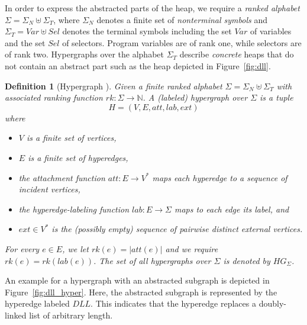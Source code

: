 \documentclass[a4paper, 12pt, twoside]{report}
\theoremstyle{plain}
\newtheorem{definition}[theorem]{Definition}
\begin{document}
	In order to express the abstracted parts of the heap, we require a \textit{ranked alphabet} $\Sigma = \Sigma_N \uplus \Sigma_T$, where $\Sigma_N$ denotes a finite set of \textit{nonterminal symbols} and $\Sigma_T=Var \uplus Sel$ denotes the terminal symbols including the set $Var$ of variables and the set $Sel$ of selectors. Program variables are of rank one, while selectors are of rank two. Hypergraphs over the alphabet $\Sigma_T$ describe \textit{concrete} heaps that do not contain an abstract part such as the heap depicted in Figure~\ref{fig:dll}.

	
	\begin{definition}[Hypergraph \cite{heinen2015verifyingPhd}]\label{def:hypergraph}
		Given a finite ranked alphabet $\Sigma = \Sigma_N \uplus \Sigma_T$ with associated ranking function $rk : \Sigma \rightarrow \mathds{N}$. A (labeled) hypergraph over $\Sigma$ is a tuple \[H = (V ,E, att, lab, ext)\]
		where 
		\begin{itemize}
			\item $V$ is a finite set of vertices,
			\item $E$ is a finite set of hyperedges,
			\item the attachment function $att : E \rightarrow V^*$ maps each hyperedge to a sequence of incident vertices, 
			\item the hyperedge-labeling function $lab : E \rightarrow \Sigma$ maps to each edge its label, and 
			\item $ext \in V^*$ is the (possibly empty) sequence of pairwise distinct external vertices. 
		\end{itemize}
		For every $e \in E$, we let $rk(e) = |att(e)|$ and we require $rk(e) = rk(lab(e))$. The set of all hypergraphs over $\Sigma$ is denoted by $HG_{\Sigma}$.
	\end{definition}
	
	An example for a hypergraph with an abstracted subgraph is depicted in Figure~\ref{fig:dll_hyper}. Here, the abstracted subgraph is represented by the hyperedge labeled $DLL$. This indicates that the hyperedge replaces a doubly-linked list of arbitrary length.
	
\end{document}

